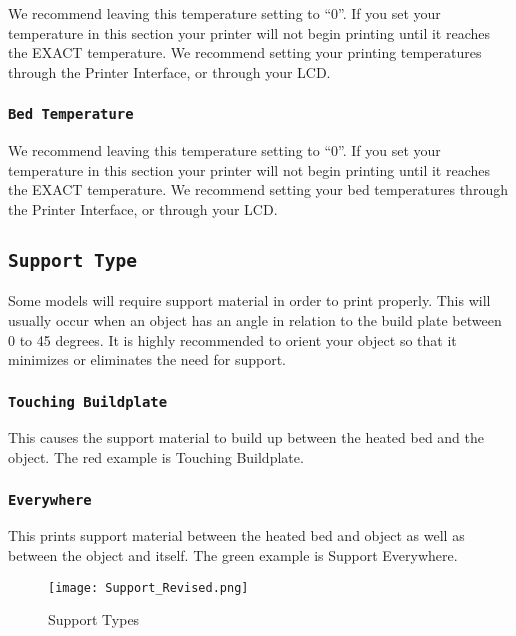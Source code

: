 We recommend leaving this temperature setting to “0”. If you set your temperature in this section your printer will not begin printing until it reaches the EXACT temperature. We recommend setting your printing temperatures through the Printer Interface, or through your LCD.

\subsubsection{\texttt{Bed Temperature}}
We recommend leaving this temperature setting to “0”. If you set your temperature in this section your printer will not begin printing until it reaches the EXACT temperature. We recommend setting your bed temperatures through the Printer Interface, or through your LCD.

\subsection{\texttt{Support Type}}
Some models will require support material in order to print properly. This will usually occur when an object has an angle in relation to the build plate between 0 to 45 degrees. It is highly recommended to orient your object so that it minimizes or eliminates the need for support.

\subsubsection{\texttt{Touching Buildplate}}
This causes the support material to build up between the heated bed and the object. The red example is Touching Buildplate.

\subsubsection{\texttt{Everywhere}}
This prints support material between the heated bed and object as well as between the object and itself. The green example is Support Everywhere.
\begin{figure}[H]
\centering
\texttt{[image: Support\_Revised.png]}
\caption{Support Types}
\label{fig:Different Types of Support}
\end{figure}

